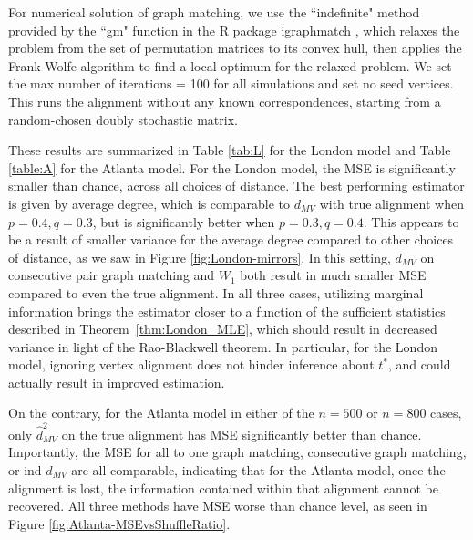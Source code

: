 \documentclass[12pt]{article}
\theoremstyle{definition}
\begin{document}
For numerical solution of graph matching,
we use the ``indefinite" method provided by the ``gm" function in the R package igraphmatch \cite{qiao2021igraphmatch}, which relaxes the problem from the set of permutation matrices to its convex hull, then applies the Frank-Wolfe algorithm to find a local optimum for the relaxed problem. We set the max number of iterations = 100 for all simulations and set no seed vertices. This runs the alignment without any known correspondences, starting from a random-chosen doubly stochastic matrix.

These results are summarized in Table \ref{tab:L} for the London model and Table \ref{table:A} for the Atlanta model. 
For the London model, the MSE is significantly smaller than chance, across all choices of distance. The best performing estimator is given by average degree, which is comparable to $d_{MV}$ with true alignment when $p = 0.4, q = 0.3$, but is significantly better when $p = 0.3, q = 0.4$. This appears to be a result of smaller variance for the average degree compared to other choices of distance, as we saw in Figure \ref{fig:London-mirrors}. In this setting, $d_{MV}$ on consecutive pair graph matching and $W_1$ both result in much smaller MSE compared to even the true alignment. In all three cases, utilizing marginal information brings the estimator closer to a function of the sufficient statistics described in Theorem~\ref{thm:London_MLE}, which should result in decreased variance in light of the Rao-Blackwell theorem. In particular, for the London model, ignoring vertex alignment does not hinder inference about $t^*$, and could actually result in improved estimation. 

On the contrary, for the Atlanta model in either of the $n=500$ or $n=800$ cases, only $\hat{d}^2_{MV}$ on the true alignment has MSE significantly better than chance. Importantly, the MSE for all to one graph matching, consecutive graph matching, or ind-$d_{MV}$ are all comparable, indicating that for the Atlanta model, once the alignment is lost, the information contained within that alignment cannot be recovered. All three methods have MSE worse than chance level, as seen in Figure \ref{fig:Atlanta-MSEvsShuffleRatio}.
\end{document}
